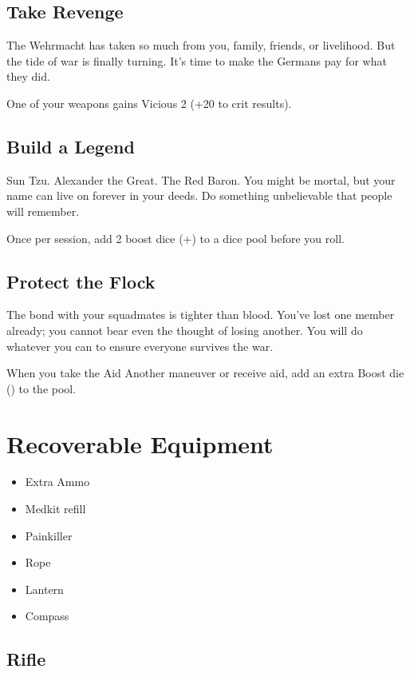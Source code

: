 \documentclass{book}
\newcommand{\bbb}{\BoostDie }
\begin{document}
\begin{multicols}{2}
\subsection{Take Revenge}

The Wehrmacht has taken so much from you, family, friends, or livelihood.  But the tide of war is finally turning.  It's time to make the Germans pay for what they did.

One of your weapons gains Vicious 2 (+20 to crit results).

\subsection{Build a Legend}

Sun Tzu.  Alexander the Great.  The Red Baron.  You might be mortal, but your name can live on forever in your deeds.  Do something unbelievable that people will remember.

Once per session, add 2 boost dice (+\bbb\bbb) to a dice pool before you roll.

\subsection{Protect the Flock}

The bond with your squadmates is tighter than blood.  You've lost one member already; you cannot bear even the thought of losing another.  You will do whatever you can to ensure everyone survives the war.

When you take the Aid Another maneuver or receive aid, add an extra Boost die (\bbb) to the pool.

\section{Recoverable Equipment}

\begin{itemize}
    \item Extra Ammo
    \item Medkit refill
    \item Painkiller
    \item Rope
    \item Lantern
    \item Compass
\end{itemize}

\subsection{Rifle}


\end{multicols}
\end{document}
